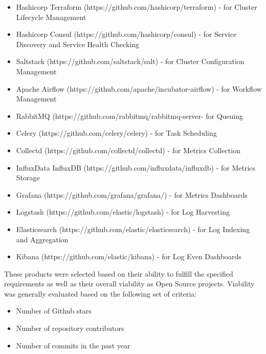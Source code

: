 \begin{itemize}
\item Hashicorp Terraform\autocite{Terraform_by_HashiCorp_2016-10-31} (https://github.com/hashicorp/terraform) - for Cluster Lifecycle Management
\item Hashicorp Consul\autocite{Consul_by_HashiCorp} (https://github.com/hashicorp/consul) - for Service Discovery and Service Health Checking
\item Saltstack\autocite{SaltStack_2016-10-31} (https://github.com/saltstack/salt) - for Cluster Configuration Management
\item Apache Airflow\autocite{Apache_Airflow__2016-10-31} (https://github.com/apache/incubator-airflow) - for Workflow Management
\item RabbitMQ\autocite{RabbitMQ_2016-10-31} (https://github.com/rabbitmq/rabbitmq-server- for Queuing
\item Celery\autocite{Celery_2016-10-31} (https://github.com/celery/celery) - for Task Scheduling
\item Collectd\autocite{collectd_2016-10-31} (https://github.com/collectd/collectd) - for Metrics Collection
\item InfluxData InfluxDB\autocite{InfluxDB} (https://github.com/influxdata/influxdb) - for Metrics Storage
\item Grafana\autocite{Grafana.net} (https://github.com/grafana/grafana/) - for Metrics Dashboards
\item Logstash\autocite{Logstash} (https://github.com/elastic/logstash) - for Log Harvesting
\item Elasticsearch\autocite{Elasticsearch} (https://github.com/elastic/elasticsearch) - for Log Indexing and Aggregation
\item Kibana\autocite{Kibana} (https://github.com/elastic/kibana) - for Log Even Dashboards
\end{itemize}

These products were selected based on their ability to fulfill the specified requirements as well as their overall viability as Open Source projects. Viability was generally evaluated based on the following set of criteria:

\begin{itemize}
\item Number of Github stars
\item Number of repository contributors
\item Number of commits in the past year
\end{itemize}

